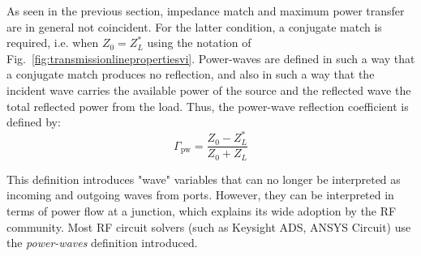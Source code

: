 As seen in the previous section, impedance match and maximum power transfer are in general not coincident. For the latter condition, a conjugate match is required, i.e. when $Z_0 = Z_L^*$ using the notation of Fig.~\ref{fig:transmissionlinepropertiesvi}. Power-waves are defined in such a way that a conjugate match produces no reflection, and also in such a way that the incident wave carries the available power of the source and the reflected wave the total reflected power from the load. Thus, the power-wave reflection coefficient is defined by:
\begin{equation}
	\Gamma_{\mathrm{pw}} = \frac{Z_0 - Z_L^*}{Z_0 + Z_L}
\end{equation}

This definition introduces "wave" variables that can no longer be interpreted as incoming and outgoing waves from ports. However, they can be interpreted in terms of power flow at a junction, which explains its wide adoption by the RF community. Most RF circuit solvers (such as Keysight ADS, ANSYS Circuit) use the \textit{power-waves} definition introduced.  

